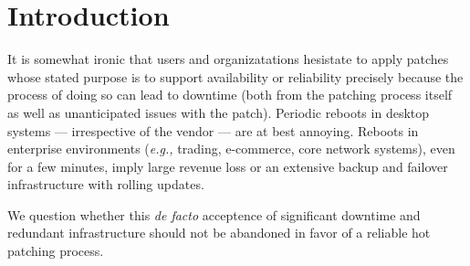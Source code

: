 \section{Introduction}
\label{sec:intro}
It is somewhat ironic that users and organizatations hesistate to
apply patches whose stated purpose is to support availability or
reliability precisely because the process of doing so can lead to
downtime (both from the patching process itself as well as
unanticipated issues with the patch).  Periodic reboots in desktop
systems --- irrespective of the vendor --- are at best annoying.
Reboots in enterprise environments ({\it e.g.,} trading, e-commerce,
core network systems), even for a few minutes, imply large revenue
loss or an extensive backup and failover infrastructure with rolling
updates.  

We question whether this {\em de facto} acceptence of
significant downtime and redundant infrastructure should not be
abandoned in favor of a reliable hot patching process.

%
%
%


